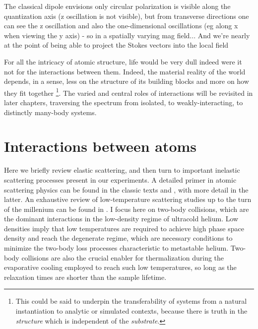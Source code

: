 	

	The classical dipole envisions only circular polarization is visible along the quantization axis (z oscillation is not visible), but from transverse directions one can see the z oscillation and also the one-dimensional oscillations (eg along x when viewing the y axis) - so in a spatially varying mag field...
	And we're nearly at the point of being able to project the Stokes vectors into the local field
	


	
	For all the intricacy of atomic structure, life would be very dull indeed were it not for the interactions between them.
	Indeed, the material reality of the world depends, in a sense, less on the structure of its building blocks and more on how they fit together \footnote{This could be said to underpin the transferability of systems from a natural instantiation to analytic or simulated contexts, because there is truth in the \emph{structure} which is independent of the \emph{substrate}.}.
	The varied and central roles of interactions will be revisited in later chapters, traversing the spectrum from isolated, to weakly-interacting, to distinctly many-body systems.
	


\section{Interactions between atoms}

	
	Here we briefly review elastic scattering, and then turn to important inelastic scattering processes present in our experiments.
	A detailed primer in atomic scattering physics can be found in the classic texts \cite{PitaevskiiStringari} and \cite{PethickSmith}, with more detail in the latter.
	An exhaustive review of low-temperature scattering studies up to the turn of the millenium can be found in \cite{weiner99}.
	I focus here on two-body collisions, which are the dominant interactions in the low-density regime of ultracold helium.
	Low densities imply that low temperatures are required to achieve high phase space density and reach the degenerate regime, which are necessary conditions to minimize the two-body loss processes characteristic to metastable helium.
	Two-body collisions are also the crucial enabler for thermalization during the evaporative cooling employed to reach such low temperatures, so long as the relaxation times are shorter than the sample lifetime.

